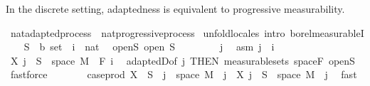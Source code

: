 \begin{isabellebody}
\begin{isamarkuptext}
In the discrete setting, adaptedness is equivalent to progressive measurability.%
\end{isamarkuptext}\isamarkuptrue%
\isamarkupfalse%
\ nat{\isacharunderscore}{\kern0pt}adapted{\isacharunderscore}{\kern0pt}process\ {\isasymsubseteq}\ nat{\isacharunderscore}{\kern0pt}progressive{\isacharunderscore}{\kern0pt}process\isanewline
%
\isadelimproof
%
\endisadelimproof
%
\isatagproof
{}\isamarkupfalse%
\ {\isacharparenleft}{\kern0pt}unfold{\isacharunderscore}{\kern0pt}locales{\isacharcomma}{\kern0pt}\ intro\ borel{\isacharunderscore}{\kern0pt}measurableI{\isacharparenright}{\kern0pt}\isanewline
\ \ \isamarkupfalse%
\ S\ {\isacharcolon}{\kern0pt}{\isacharcolon}{\kern0pt}\ {\isachardoublequoteopen}{\isacharprime}{\kern0pt}b\ set{\isachardoublequoteclose}\ \ i\ {\isacharcolon}{\kern0pt}{\isacharcolon}{\kern0pt}\ nat\ \isamarkupfalse%
\ open{\isacharunderscore}{\kern0pt}S{\isacharcolon}{\kern0pt}\ {\isachardoublequoteopen}open\ S{\isachardoublequoteclose}\isanewline
\ \ \isacommand{{\isacharbraceleft}{\kern0pt}}\isamarkupfalse%
\isanewline
\ \ \ \ \isamarkupfalse%
\ j\ \isamarkupfalse%
\ asm{\isacharcolon}{\kern0pt}\ {\isachardoublequoteopen}j\ {\isasymle}\ i{\isachardoublequoteclose}\isanewline
\ \ \ \ \isamarkupfalse%
\ {\isachardoublequoteopen}X\ j\ {\isacharminus}{\kern0pt}{\isacharbackquote}{\kern0pt}\ S\ {\isasyminter}\ space\ M\ {\isasymin}\ F\ i{\isachardoublequoteclose}\ \isamarkupfalse%
\ adaptedD{\isacharbrackleft}{\kern0pt}of\ j{\isacharcomma}{\kern0pt}\ THEN\ measurable{\isacharunderscore}{\kern0pt}sets{\isacharbrackright}{\kern0pt}\ space{\isacharunderscore}{\kern0pt}F\ open{\isacharunderscore}{\kern0pt}S\ \isamarkupfalse%
\ fastforce\isanewline
\ \ \ \ \isamarkupfalse%
\ \isamarkupfalse%
\ {\isachardoublequoteopen}case{\isacharunderscore}{\kern0pt}prod\ X\ {\isacharminus}{\kern0pt}{\isacharbackquote}{\kern0pt}\ S\ {\isasyminter}\ {\isacharbraceleft}{\kern0pt}j{\isacharbraceright}{\kern0pt}\ {\isasymtimes}\ space\ M\ {\isacharequal}{\kern0pt}\ {\isacharbraceleft}{\kern0pt}j{\isacharbraceright}{\kern0pt}\ {\isasymtimes}\ {\isacharparenleft}{\kern0pt}X\ j\ {\isacharminus}{\kern0pt}{\isacharbackquote}{\kern0pt}\ S\ {\isasyminter}\ space\ M{\isacharparenright}{\kern0pt}{\isachardoublequoteclose}\ \ j\ \isamarkupfalse%
\ fast\isanewline
\ \ \ \ \isamarkupfalse%

\end{isabellebody}
